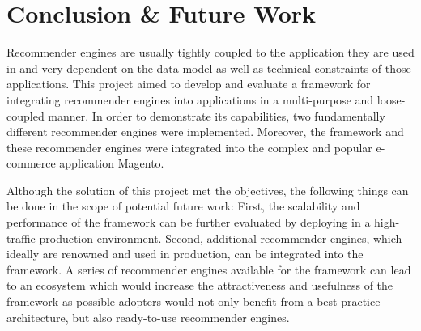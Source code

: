 \chapter{Conclusion \& Future Work}

Recommender engines are usually tightly coupled to the application they are used in and very dependent on the data model as well as technical constraints of those applications. This project aimed to develop and evaluate a framework for integrating recommender engines into applications in a multi-purpose and loose-coupled manner. In order to demonstrate its capabilities, two fundamentally different recommender engines were implemented. Moreover, the framework and these recommender engines were integrated into the complex and popular e-commerce application Magento.

Although the solution of this project met the objectives, the following things can be done in the scope of potential future work: First, the scalability and performance of the framework can be  further evaluated by deploying in a high-traffic production environment. Second, additional recommender engines, which ideally are renowned and used in production, can be integrated into the framework. A series of recommender engines available for the framework can lead to an ecosystem which would increase the attractiveness and usefulness of the framework as possible adopters would not only benefit from a best-practice architecture, but also ready-to-use recommender engines.